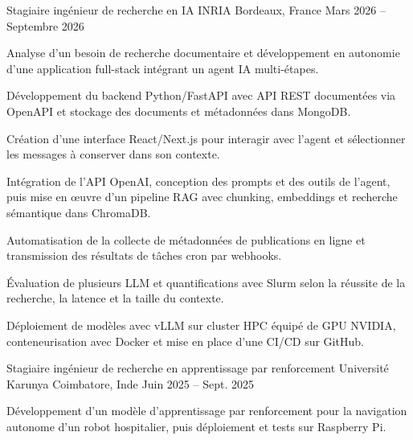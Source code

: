
\begin{cventries}
  \cventry
    {Stagiaire ingénieur de recherche en IA}
    {INRIA}
    {Bordeaux, France}
    {Mars 2026 -- Septembre 2026}
    {
      \begin{cvitems}
        \item {Analyse d’un besoin de recherche documentaire et développement en autonomie d’une application full-stack intégrant un agent IA multi-étapes.}
        \item {Développement du backend Python/FastAPI avec API REST documentées via OpenAPI et stockage des documents et métadonnées dans MongoDB.}
        \item {Création d’une interface React/Next.js pour interagir avec l’agent et sélectionner les messages à conserver dans son contexte.}
        \item {Intégration de l’API OpenAI, conception des prompts et des outils de l’agent, puis mise en œuvre d’un pipeline RAG avec chunking, embeddings et recherche sémantique dans ChromaDB.}
        \item {Automatisation de la collecte de métadonnées de publications en ligne et transmission des résultats de tâches cron par webhooks.}
        \item {Évaluation de plusieurs LLM et quantifications avec Slurm selon la réussite de la recherche, la latence et la taille du contexte.}
        \item {Déploiement de modèles avec vLLM sur cluster HPC équipé de GPU NVIDIA, conteneurisation avec Docker et mise en place d’une CI/CD sur GitHub.}
      \end{cvitems}
    }

  \cventry
    {Stagiaire ingénieur de recherche en apprentissage par renforcement}
    {Université Karunya}
    {Coimbatore, Inde}
    {Juin 2025 -- Sept. 2025}
    {
      \begin{cvitems}
        \item {Développement d’un modèle d’apprentissage par renforcement pour la navigation autonome d’un robot hospitalier, puis déploiement et tests sur Raspberry Pi.}
      \end{cvitems}
    }
\end{cventries}
